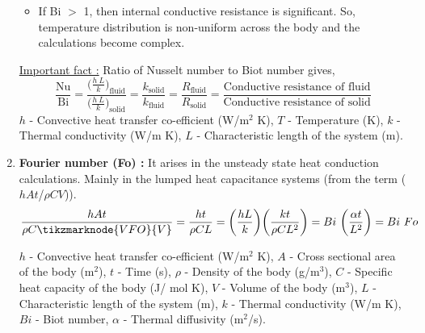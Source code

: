 \documentclass[a4paper, 12 pt]{article}
\begin{document}
\begin{enumerate}
\begin{itemize}
        \item If Bi $>$ 1, then internal conductive resistance is significant. So, temperature distribution is non-uniform across the body and the calculations become complex.
    \end{itemize}
    \underline{Important fact :} Ratio of Nusselt number to Biot number gives,$$\frac{\text{Nu}}{\text{Bi}}= \frac{\big( \frac{h\ L}{k} \big)_{\text{fluid}}}{\big( \frac{h\ L}{k} \big)_{\text{solid}}}=\frac{k_{\text{solid}}}{k_{\text{fluid}}}=\frac{R_{\text{fluid}}}{R_{\text{solid}}}=\frac{\text{Conductive resistance of fluid}}{\text{Conductive resistance of solid}}$$
    $h$ - Convective heat transfer co-efficient (W/m$^2$ K), $T$ - Temperature (K), $k$ - Thermal conductivity (W/m K), $L$ - Characteristic length of the system (m).
    
    \item \textbf{Fourier number (Fo) :} It arises in the unsteady state heat conduction calculations. Mainly in the lumped heat capacitance systems (from the term ($hAt$/$\rho CV$)).$$\frac{hAt}{\rho C\tikzmarknode{VFO}{V}}=\frac{ht}{\rho CL}=\bigg( \frac{hL}{k} \bigg) \bigg( \frac{kt}{\rho CL^2}\bigg)=Bi\ \bigg( \frac{\alpha t}{L^2}\bigg)=Bi\ Fo$$ 
    
    
    \vspace{ 2 mm } $h$ - Convective  heat  transfer  co-efficient  (W/m$^2$ K), $A$ - Cross sectional area of the body (m$^2$), $t$ - Time (s), $\rho$ - Density of the body (g/m$^3$), $C$ - Specific heat capacity of the body (J/ mol K), $V$ - Volume of the body (m$^3$), $L$ - Characteristic length of the system (m), $k$ - Thermal conductivity (W/m K), $Bi$ - Biot number, $\alpha$ - Thermal diffusivity (m$^2$/s).
    

\end{enumerate}
\end{document}
